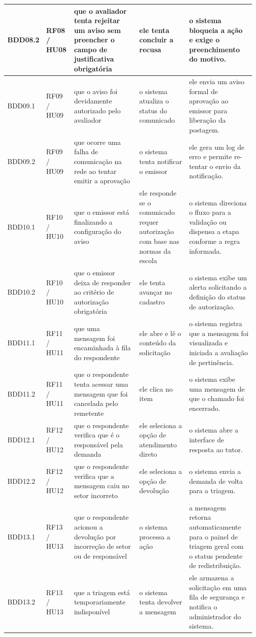 \documentclass[a4paper,12pt]{report}
\begin{document}
\begin{longtable}{|p{1.6cm}|p{1.6cm}|p{3.6cm}|p{3.6cm}|p{4.0cm}|}
\hline
BDD08.2 & RF08 / HU08 & que o avaliador tenta rejeitar um aviso sem preencher o campo de justificativa obrigatória & ele tenta concluir a recusa & o sistema bloqueia a ação e exige o preenchimento do motivo. \\
\hline
BDD09.1 & RF09 / HU09 & que o aviso foi devidamente autorizado pelo avaliador & o sistema atualiza o status do comunicado & ele envia um aviso formal de aprovação ao emissor para liberação da postagem. \\
\hline
BDD09.2 & RF09 / HU09 & que ocorre uma falha de comunicação na rede ao tentar emitir a aprovação & o sistema tenta notificar o emissor & ele gera um log de erro e permite re-tentar o envio da notificação. \\
\hline
BDD10.1 & RF10 / HU10 & que o emissor está finalizando a configuração do aviso & ele responde se o comunicado requer autorização com base nas normas da escola & o sistema direciona o fluxo para a validação ou dispensa a etapa conforme a regra informada. \\
\hline
BDD10.2 & RF10 / HU10 & que o emissor deixa de responder ao critério de autorização obrigatória & ele tenta avançar no cadastro & o sistema exibe um alerta solicitando a definição do status de autorização. \\
\hline
BDD11.1 & RF11 / HU11 & que uma mensagem foi encaminhada à fila do respondente & ele abre e lê o conteúdo da solicitação & o sistema registra que a mensagem foi visualizada e iniciada a avaliação de pertinência. \\
\hline
BDD11.2 & RF11 / HU11 & que o respondente tenta acessar uma mensagem que foi cancelada pelo remetente & ele clica no item & o sistema exibe uma mensagem de que o chamado foi encerrado. \\
\hline
BDD12.1 & RF12 / HU12 & que o respondente verifica que é o responsável pela demanda & ele seleciona a opção de atendimento direto & o sistema abre a interface de resposta ao tutor. \\
\hline
BDD12.2 & RF12 / HU12 & que o respondente verifica que a mensagem caiu no setor incorreto & ele seleciona a opção de devolução & o sistema envia a demanda de volta para a triagem. \\
\hline
BDD13.1 & RF13 / HU13 & que o respondente acionou a devolução por incorreção de setor ou de responsável & o sistema processa a ação & a mensagem retorna automaticamente para o painel de triagem geral com o status pendente de redistribuição. \\
\hline
BDD13.2 & RF13 / HU13 & que a triagem está temporariamente indisponível & o sistema tenta devolver a mensagem & ele armazena a solicitação em uma fila de segurança e notifica o administrador do sistema. \\

\end{longtable}
\end{document}
